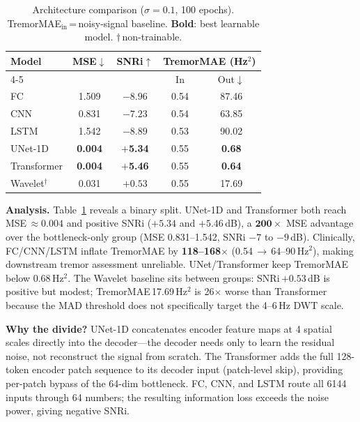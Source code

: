 \documentclass{article}
\begin{document}
\begin{table}[h]
\caption{Architecture comparison ($\sigma=0.1$, 100 epochs).
TremorMAE$_\text{in}$\,=\,noisy-signal baseline.
\textbf{Bold}: best learnable model. $\dagger$\,non-trainable.}
\label{tab:arch-results}
\vspace{-4pt}
\begin{center}
\small
\begin{tabular}{lcccc}
\toprule
\textbf{Model} & \textbf{MSE$\downarrow$} & \textbf{SNRi$\uparrow$} &
  \multicolumn{2}{c}{\textbf{TremorMAE (Hz$^2$)}} \\
\cmidrule(lr){4-5}
& & & In & Out$\downarrow$ \\
\midrule
FC          & 1.509 & $-8.96$ & 0.54 & \phantom{0}87.46 \\
CNN         & 0.831 & $-7.23$ & 0.54 & \phantom{0}63.85 \\
LSTM        & 1.542 & $-8.89$ & 0.53 & \phantom{0}90.02 \\
UNet-1D     & \textbf{0.004} & $+$\textbf{5.34} & 0.55 & \phantom{00}\textbf{0.68} \\
Transformer & \textbf{0.004} & $+$\textbf{5.46} & 0.55 & \phantom{00}\textbf{0.64} \\
\midrule
Wavelet$^\dagger$ & 0.031 & $+0.53$ & 0.55 & \phantom{0}17.69 \\
\bottomrule
\end{tabular}
\end{center}
\vspace{-6pt}
\end{table}

\textbf{Analysis.}
Table~\ref{tab:arch-results} reveals a binary split.
UNet-1D and Transformer both reach MSE\,$\approx 0.004$ and positive SNRi
($+5.34$ and $+5.46$\,dB), a $\mathbf{200\times}$ MSE advantage over the
bottleneck-only group (MSE 0.831--1.542, SNRi $-7$ to $-9$\,dB).
Clinically, FC/CNN/LSTM inflate TremorMAE by \textbf{118--168$\times$}
(0.54\,$\to$\,64--90\,Hz$^2$), making downstream tremor assessment unreliable.
UNet/Transformer keep TremorMAE below 0.68\,Hz$^2$.
The Wavelet baseline sits between groups: SNRi\,$+0.53$\,dB is positive but
modest; TremorMAE\,17.69\,Hz$^2$ is 26$\times$ worse than Transformer because
the MAD threshold does not specifically target the 4--6\,Hz DWT scale.

\textbf{Why the divide?}
UNet-1D concatenates encoder feature maps at 4 spatial scales directly into
the decoder---the decoder needs only to learn the residual noise, not
reconstruct the signal from scratch.
The Transformer adds the full 128-token encoder patch sequence to its decoder
input (patch-level skip), providing per-patch bypass of the 64-dim bottleneck.
FC, CNN, and LSTM route all 6144 inputs through 64 numbers; the resulting
information loss exceeds the noise power, giving negative SNRi.
\end{document}
